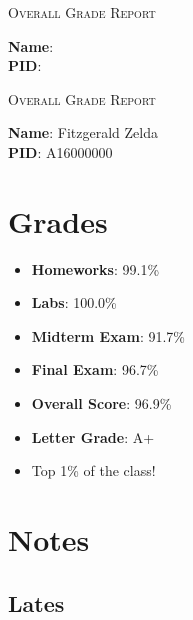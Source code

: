 \documentclass{article}
\begin{document}
\begin{center}
    \textsc{Overall Grade Report}
\end{center}
\vspace{4em}


\textbf{Name}: \\[2em]


\textbf{PID}:
\vspace{4em}
\newpage

\begin{center}
    \textsc{Overall Grade Report}
\end{center}
\vspace{4em}


\textbf{Name}: Fitzgerald Zelda\\[2em]


\textbf{PID}: A16000000
\vspace{4em}

\section*{Grades}

\begin{itemize}


\item \textbf{Homeworks}: 99.1\%


\item \textbf{Labs}: 100.0\%


\item \textbf{Midterm Exam}: 91.7\%


\item \textbf{Final Exam}: 96.7\%


\end{itemize}

\begin{itemize}
    \item \textbf{Overall Score}: 96.9\%
    \item \textbf{Letter Grade}: A+


\item Top 1\% of the class!


\end{itemize}

\section*{Notes}


\subsection*{Lates}
\end{document}
